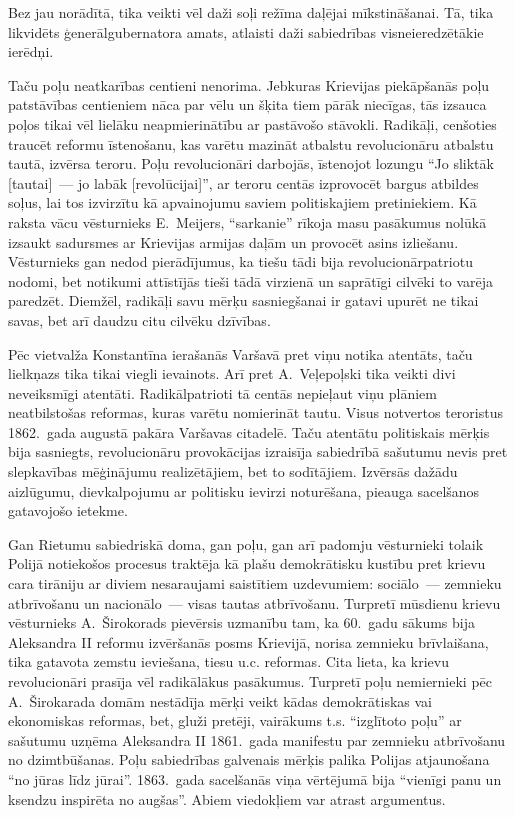 \documentclass[twoside,a5paper,12pt,fleqn,openany]{extbook}
\begin{document}
Bez jau norādītā, tika veikti vēl daži soļi režīma daļējai mīkstināšanai. Tā, tika likvidēts ģenerālgubernatora amats, atlaisti daži sabiedrības visneieredzētākie ierēdņi.

Taču poļu neatkarības centieni nenorima. Jebkuras Krievijas piekāpšanās poļu patstāvības centieniem nāca par vēlu un šķita tiem pārāk niecīgas, tās izsauca poļos tikai vēl lielāku neapmierinātību ar pastāvošo stāvokli. Radikāļi, cenšoties traucēt reformu īstenošanu, kas varētu mazināt atbalstu revolucionāru atbalstu tautā, izvērsa teroru. Poļu revolucionāri darbojās, īstenojot lozungu ``Jo sliktāk [tautai]~--- jo labāk [revolūcijai]'', ar teroru centās izprovocēt bargus atbildes soļus, lai tos izvirzītu kā apvainojumu saviem politiskajiem pretiniekiem. Kā raksta vācu vēsturnieks E.~Meijers, ``sarkanie'' rīkoja masu pasākumus nolūkā izsaukt sadursmes ar Krievijas armijas daļām un provocēt asins izliešanu. Vēsturnieks gan nedod pierādījumus, ka tiešu tādi bija revolucionārpatriotu nodomi, bet notikumi attīstījās tieši tādā virzienā un saprātīgi cilvēki to varēja paredzēt. Diemžēl, radikāļi savu mērķu sasniegšanai ir gatavi upurēt ne tikai savas, bet arī daudzu citu cilvēku dzīvības.

Pēc vietvalža Konstantīna ierašanās Varšavā pret viņu notika atentāts, taču lielkņazs tika tikai viegli ievainots. Arī pret A.~Veļepoļski tika veikti divi neveiksmīgi atentāti. Radikālpatrioti tā centās nepieļaut viņu plāniem neatbilstošas reformas, kuras varētu nomierināt tautu. Visus notvertos teroristus 1862.~gada augustā pakāra Varšavas citadelē. Taču atentātu politiskais mērķis bija sasniegts, revolucionāru provokācijas izraisīja sabiedrībā sašutumu nevis pret slepkavības mēģinājumu realizētājiem, bet to sodītājiem. Izvērsās dažādu aizlūgumu, dievkalpojumu ar politisku ievirzi noturēšana, pieauga sacelšanos gatavojošo ietekme.

Gan Rietumu sabiedriskā doma, gan poļu, gan arī padomju vēsturnieki tolaik Polijā notiekošos procesus traktēja kā plašu demokrātisku kustību pret krievu cara tirāniju ar diviem nesaraujami saistītiem uzdevumiem: sociālo~--- zemnieku atbrīvošanu un nacionālo~--- visas tautas atbrīvošanu. Turpretī mūsdienu krievu vēsturnieks A.~Širokorads pievērsis uzmanību tam, ka 60.~gadu sākums bija Aleksandra II reformu izvēršanās posms Krievijā, norisa zemnieku brīvlaišana, tika gatavota zemstu ieviešana, tiesu u.c. reformas. Cita lieta, ka krievu revolucionāri prasīja vēl radikālākus pasākumus. Turpretī poļu nemiernieki pēc A.~Širokarada domām nestādīja mērķi veikt kādas demokrātiskas vai ekonomiskas reformas, bet, gluži pretēji, vairākums t.s. ``izglītoto poļu'' ar sašutumu uzņēma Aleksandra II 1861.~gada manifestu par zemnieku atbrīvošanu no dzimtbūšanas. Poļu sabiedrības galvenais mērķis palika Polijas atjaunošana ``no jūras līdz jūrai''. 1863.~gada sacelšanās viņa vērtējumā bija ``vienīgi panu un ksendzu inspirēta no augšas''. Abiem viedokļiem var atrast argumentus.
\end{document}
